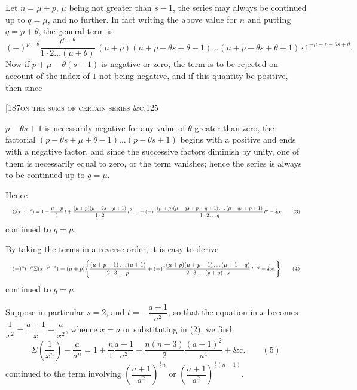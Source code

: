 \documentclass[11pt]{article}
\begin{document}
\medskip
Let $n = \mu + p$, $\mu$ being not greater than $s-1$, the series may always be continued
up to $q = \mu$, and no further. In fact writing the above value for $n$ and putting
$q = p + \theta$, the general term is
\[
(-)^{p+\theta}\frac{t^{p+\theta}}{1\cdot 2\ldots(\mu+\theta)}\,(\mu+p)(\mu+p-\theta s + \theta - 1)\ldots(\mu+p-\theta s + \theta + 1)\cdot 1^{-\mu+p-\theta s+\theta}.
\]
Now if $p + \mu - \theta(s-1)$ is negative or zero, the term is to be rejected on account
of the index of $1$ not being negative, and if this quantity be positive, then since

\begin{center}\small[187\hfill\textsc{on the sums of certain series \&c.}\hfill\textsc{125}\end{center}

\noindent $p - \theta s + 1$ is necessarily negative for any value of $\theta$ greater than zero, the factorial
$(p - \theta s + \mu + \theta - 1)\ldots(p - \theta s + 1)$ begins with a positive and ends with a negative factor,
and since the successive factors diminish by unity, one of them is necessarily equal to
zero, or the term vanishes; hence the series is always to be continued up to $q = \mu$.

Hence
\[ \resizebox{\textwidth}{!}{$\displaystyle
\Sigma(x^{-\mu-p}) = 1 - \frac{\mu+p}{1}\,t + \frac{(\mu+p)(\mu-2s+\rho+1)}{1\cdot 2}\,t^{2}\ldots + (-)^{\mu}\frac{(\mu+p)(\mu-qs+p+q+1)\ldots(\mu-qs+p+1)}{1\cdot 2\ldots q}\,t^{\mu} - \&\text{c.} \qquad (3)
$} \]
continued to $q = \mu$.

By taking the terms in a reverse order, it is easy to derive
\[ \resizebox{\textwidth}{!}{$\displaystyle
(-)^{\mu} t^{-\mu}\Sigma(x^{-\mu-p}) = (\mu+p)\Bigg\{\frac{(\mu+p-1)\ldots(\mu+1)}{2\cdot 3\ldots p} + (-)^{q}\frac{(\mu+p)(\mu+p-1)\ldots(\mu+1-q)}{2\cdot 3\ldots(p+q)\cdot s}\,t^{-q} - \&\text{c.}\Bigg\} \qquad (4)
$} \]
continued to $q = \mu$.

\medskip
Suppose in particular $s = 2$, and $t = -\dfrac{a+1}{a^{2}}$, so that the equation in $x$ becomes
$\dfrac{1}{x^{2}} = \dfrac{a+1}{x} - \dfrac{a}{x^{2}}$, whence $x = a$ or substituting in (2), we find
\[
\Sigma\!\left(\frac{1}{x^{n}}\right) - \frac{a}{a^{n}} = 1 + \frac{n}{1}\frac{a+1}{a^{2}} + \frac{n(n-3)}{2}\frac{(a+1)^{2}}{a^{4}} + \&\text{c.} \qquad (5)
\]
continued to the term involving $\left(\dfrac{a+1}{a^{2}}\right)^{\frac{1}{2}n}$ or $\left(\dfrac{a+1}{a^{2}}\right)^{\frac{1}{2}(n-1)}$.
\end{document}
